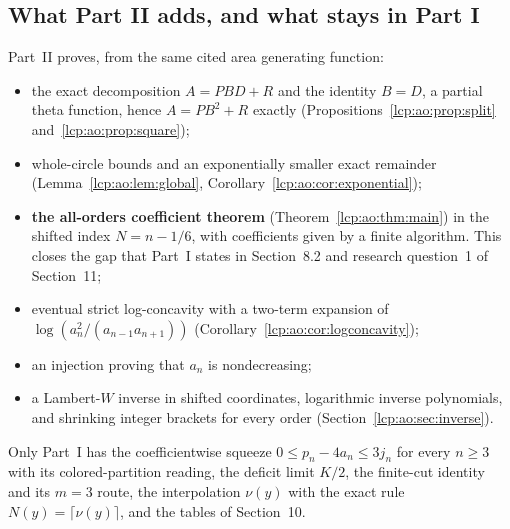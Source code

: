 \documentclass[11pt]{article}
\numberwithin{equation}{section}
\theoremstyle{definition}\newtheorem{definition}[theorem]{Definition}
\theoremstyle{remark}\newtheorem{remark}[theorem]{Remark}
\begin{document}
\subsection{What Part II adds, and what stays in Part I}
Part~II proves, from the same cited area generating function:
\begin{itemize}[leftmargin=*,itemsep=0.15em]
\item the exact decomposition $A=PBD+R$ and the identity $B=D$, a partial
 theta function, hence $A=PB^2+R$ exactly
 (Propositions~\ref{lcp:ao:prop:split} and~\ref{lcp:ao:prop:square});
\item whole-circle bounds and an exponentially smaller exact remainder
 (Lemma~\ref{lcp:ao:lem:global}, Corollary~\ref{lcp:ao:cor:exponential});
\item \textbf{the all-orders coefficient theorem}
 (Theorem~\ref{lcp:ao:thm:main}) in the shifted index $N=n-1/6$, with
 coefficients given by a finite algorithm. This closes the gap that
 Part~I states in Section~8.2 and research question~1 of Section~11;
\item eventual strict log-concavity with a two-term expansion of
 $\log(a_n^2/(a_{n-1}a_{n+1}))$ (Corollary~\ref{lcp:ao:cor:logconcavity});
\item an injection proving that $a_n$ is nondecreasing;
\item a Lambert-$W$ inverse in shifted coordinates, logarithmic inverse
 polynomials, and shrinking integer brackets for every order
 (Section~\ref{lcp:ao:sec:inverse}).
\end{itemize}
Only Part~I has the coefficientwise squeeze $0\le p_n-4a_n\le3j_n$ for
every $n\ge3$ with its colored-partition reading, the deficit limit $K/2$,
the finite-cut identity and its $m=3$ route, the interpolation $\nu(y)$
with the exact rule $N(y)=\lceil\nu(y)\rceil$, and the tables of
Section~10.
\end{document}
